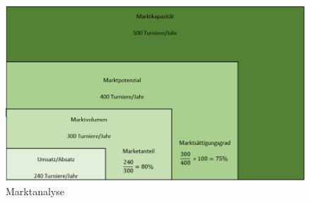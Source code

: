 \documentclass[10pt]{scrartcl}
\begin{document}

    

    

    




	\appendix
    \begin{figure}[H]
        \centering
        \includegraphics[width=0.85\linewidth]{images/marktanalyse.PNG}
        \caption{Marktanalyse}
        \label{fig:marktanalyse}
    \end{figure}
\end{document}
